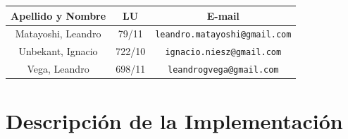 \documentclass[a4paper, 10pt, twoside]{article}
\begin{document}
\begin{center}
\vspace{0.5cm}

\begin{tabular}{|c|c|c|}
\hline
Apellido y Nombre & LU & E-mail\\
\hline
Matayoshi, Leandro  & 79/11 & {\tt leandro.matayoshi@gmail.com}\\
Unbekant, Ignacio  & 722/10 & {\tt ignacio.niesz@gmail.com}\\
Vega, Leandro    & 698/11 & {\tt leandrogvega@gmail.com}\\
\hline
\end{tabular}

\end{center}

\newpage
{}



\tableofcontents

\newpage



\section{Descripción de la Implementación}


\newpage
\end{document}
